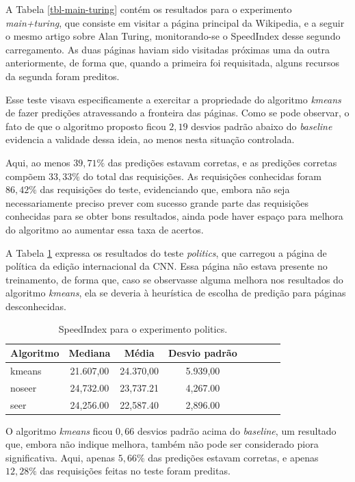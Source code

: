 \documentclass[10pt,twocolumn,letterpaper]{article}
\begin{document}
A Tabela \ref{tbl-main-turing} contém os resultados para o experimento \emph{main+turing}, que consiste em visitar a página principal da Wikipedia, e a seguir o mesmo artigo sobre Alan Turing, monitorando-se o SpeedIndex desse segundo carregamento. As duas páginas haviam sido visitadas próximas uma da outra anteriormente, de forma que, quando a primeira foi requisitada, alguns recursos da segunda foram preditos.

Esse teste visava especificamente a exercitar a propriedade do algoritmo \emph{kmeans} de fazer predições atravessando a fronteira das páginas. Como se pode observar, o fato de que o algoritmo proposto ficou $2,19$ desvios padrão abaixo do \emph{baseline} evidencia a validade dessa ideia, ao menos nesta situação controlada.

Aqui, ao menos $39,71 \%$ das predições estavam corretas, e as predições corretas compõem $33,33 \%$ do total das requisições. As requisições conhecidas foram $86,42 \%$ das requisições do teste, evidenciando que, embora não seja necessariamente preciso prever com sucesso grande parte das requisições conhecidas para se obter bons resultados, ainda pode haver espaço para melhora do algoritmo ao aumentar essa taxa de acertos.

A Tabela \ref{tbl-cnn-politics} expressa os resultados do teste \emph{politics}, que carregou a página de política da edição internacional da CNN. Essa página não estava presente no treinamento, de forma que, caso se observasse alguma melhora nos resultados do algoritmo \emph{kmeans}, ela se deveria à heurística de escolha de predição para páginas desconhecidas.

\begin{table}
\begin{center}
\begin{tabular}{l*{6}{c}r}
\hline
Algoritmo & Mediana & Média & Desvio padrão \\
\hline
kmeans & 21.607,00 & 24.370,00 & 5.939,00 \\
noseer  & 24,732.00 & 23,737.21  & 4,267.00 \\
seer & 24,256.00 & 22,587.40 & 2,896.00 \\
\hline
\end{tabular}
\end{center}
\caption{SpeedIndex para o experimento politics.}
\label{tbl-cnn-politics}
\end{table}

O algoritmo \emph{kmeans} ficou $0,66$ desvios padrão acima do \emph{baseline}, um resultado que, embora não indique melhora, também não pode ser considerado piora significativa. Aqui, apenas $5,66 \%$ das predições estavam corretas, e apenas $12,28 \%$ das requisições feitas no teste foram preditas.
\end{document}
